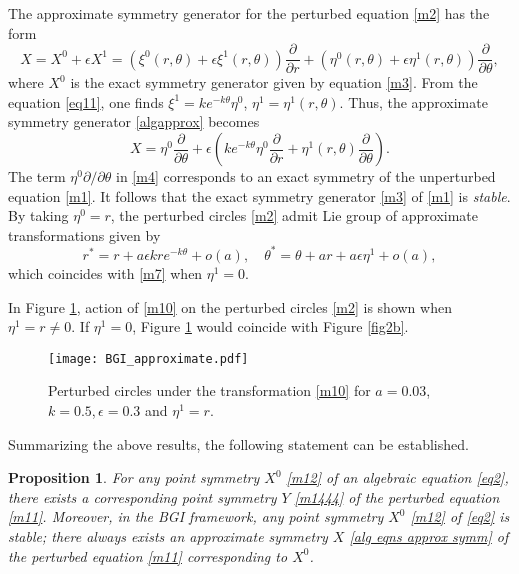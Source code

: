 \documentclass[11pt,letter,subeqn]{article}
\newtheorem{proposition}{Proposition}
\begin{document}
The approximate symmetry generator for the perturbed equation \eqref{m2} has the form
 \begin{equation}\label{algapprox}
   X = X^0+\epsilon X^1 = \left(\xi^0(r,\theta)+\epsilon \xi^1(r,\theta)\right)\dfrac{\partial}{\partial r}+ \left(\eta^0(r,\theta)+\epsilon \eta^1(r,\theta)\right) \dfrac{\partial}{\partial \theta},
 \end{equation}
    where $X^0$ is the exact symmetry generator given by equation \eqref{m3}. From the equation \eqref{eq11}, one finds $\xi^1=ke^{-k \theta}\eta^0 $, $\eta^1=\eta^1(r,\theta).$ Thus, the approximate symmetry generator \eqref{algapprox} becomes
    \begin{equation}\label{m4}
      X = \eta^0\dfrac{\partial}{\partial \theta}+\epsilon \left( ke^{-k \theta}\eta^0\dfrac{\partial}{\partial r} + \eta^1(r,\theta) \dfrac{\partial}{\partial \theta}\right).
    \end{equation}
     The term $\eta^0 \partial/\partial \theta$ in \eqref{m4} corresponds to an exact symmetry of the unperturbed equation \eqref{m1}. It follows that the exact symmetry generator \eqref{m3} of \eqref{m1} is \textit{stable}. By taking $\eta^0=r$, the perturbed circles \eqref{m2} admit Lie group of approximate transformations given by
    \begin{equation}\label{m10}
      r^* = r+a\epsilon kre^{-k \theta}+ o(a),\quad \theta^* = \theta+ar+a \epsilon \eta^1+ o(a),
    \end{equation}
    which coincides with \eqref{m7} when $\eta^1=0$.

    In Figure \ref{fig3}, action of \eqref{m10} on the perturbed circles \eqref{m2} is shown when $\eta^1=r\neq 0$. If $\eta^1=0$, Figure \ref{fig3} would coincide with Figure \ref{fig2b}.


     \begin{figure}[H]
       \centering
       \texttt{[image: BGI\_approximate.pdf]}
       \caption{Perturbed circles under the transformation \eqref{m10} for $a=0.03$, $k=0.5$,\,$\epsilon=0.3$ and $\eta^1=r$.}\label{fig3}
     \end{figure}


\medskip

Summarizing the above results, the following statement can be established.
\begin{proposition}
For any point symmetry $X^0$ \eqref{m12} of an algebraic equation \eqref{eq2}, there exists a corresponding point symmetry $Y$ \eqref{m1444} of the perturbed equation \eqref{m11}. Moreover, in the BGI framework, any point symmetry $X^0$ \eqref{m12} of \eqref{eq2} is stable; there always exists an approximate symmetry $X$ \eqref{alg eqns approx symm} of the perturbed equation \eqref{m11} corresponding to $X^0$.
\end{proposition}
\end{document}
